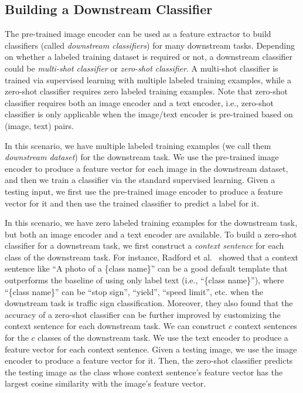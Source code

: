 \subsection{Building a Downstream Classifier}
The pre-trained image encoder can be used as a feature extractor to build classifiers (called \emph{downstream classifiers}) for many downstream tasks. 
Depending on whether a labeled training dataset is required or not, a downstream classifier could be \emph{multi-shot classifier} or \emph{zero-shot classifier}. A multi-shot classifier is trained via supervised learning with multiple labeled training examples, while a zero-shot classifier requires zero labeled training examples. Note that zero-shot classifier requires both  an image encoder and a text encoder, i.e., zero-shot classifier is only applicable when the image/text encoder is pre-trained based on (image, text) pairs.  

In this scenario, we have multiple labeled training examples (we call them \emph{downstream dataset}) for the downstream task. 
We use the pre-trained image encoder to produce a feature vector for each image in the downstream dataset, and then we  train a classifier via the standard supervised learning. 
Given a testing input, we  first use the pre-trained image encoder to produce a feature vector for it and then use the  trained classifier to predict a label for it. 

    


 In this scenario, we have zero labeled training examples for the downstream task, but both an image encoder and a text encoder are available. To build a zero-shot classifier for a downstream task, we first construct a \emph{context sentence} for each class of the downstream task. For instance, Radford et al.~\cite{radford2021learning} showed that a context sentence like ``A photo of a \{class name\}'' can be a good default template that outperforms the baseline of using only label text (i.e., ``\{class name\}''), where ``\{class name\}'' can be ``stop sign'', ``yield'', ``speed limit'', etc. when the downstream task is traffic sign classification. Moreover, they also found that the accuracy of a zero-shot classifier can be further improved by customizing the context sentence for each downstream task. We can construct $c$ context sentences for the $c$ classes of the downstream task. We use the text encoder to produce a feature vector for each context sentence. Given a testing image, we use the image encoder to produce a feature vector for it. Then, the zero-shot classifier predicts the testing image as the class whose context sentence's feature vector has the largest cosine similarity with the image's feature vector. 



